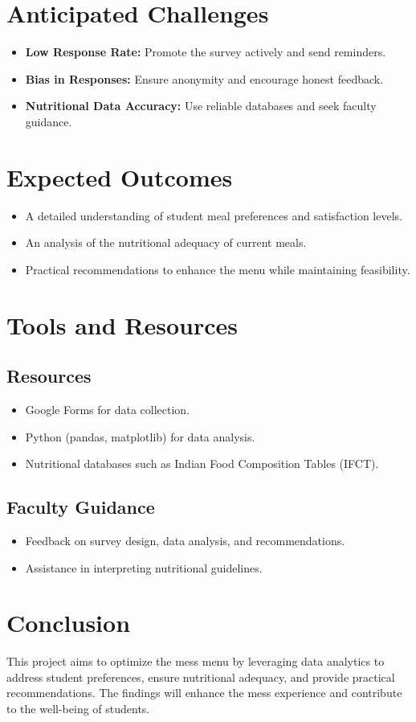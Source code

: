 \documentclass[12pt,a4paper]{article}
\begin{document}
\section*{Anticipated Challenges}
\begin{itemize}
    \item \textbf{Low Response Rate:} Promote the survey actively and send reminders.
    \item \textbf{Bias in Responses:} Ensure anonymity and encourage honest feedback.
    \item \textbf{Nutritional Data Accuracy:} Use reliable databases and seek faculty guidance.
\end{itemize}

\section*{Expected Outcomes}
\begin{itemize}
    \item A detailed understanding of student meal preferences and satisfaction levels.
    \item An analysis of the nutritional adequacy of current meals.
    \item Practical recommendations to enhance the menu while maintaining feasibility.
\end{itemize}

\section*{Tools and Resources}
\subsection*{Resources}
\begin{itemize}
    \item Google Forms for data collection.
    \item Python (pandas, matplotlib) for data analysis.
    \item Nutritional databases such as Indian Food Composition Tables (IFCT).
\end{itemize}

\subsection*{Faculty Guidance}
\begin{itemize}
    \item Feedback on survey design, data analysis, and recommendations.
    \item Assistance in interpreting nutritional guidelines.
\end{itemize}

\section*{Conclusion}
This project aims to optimize the mess menu by leveraging data analytics to address student preferences, ensure nutritional adequacy, and provide practical recommendations. The findings will enhance the mess experience and contribute to the well-being of students.
\end{document}
